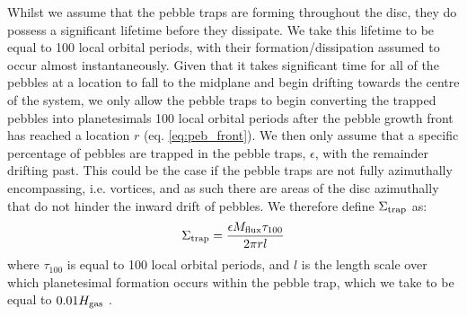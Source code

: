 \documentclass[a4paper,fleqn,usenatbib]{mnras}
\begin{document}
Whilst we assume that the pebble traps are forming throughout the disc, they do possess a significant lifetime before they dissipate.
We take this lifetime to be equal to 100 local orbital periods, with their formation/dissipation assumed to occur almost instantaneously.
Given that it takes significant time for all of the pebbles at a location to fall to the midplane and begin drifting towards the centre of the system, we only allow the pebble traps to begin converting the trapped pebbles into planetesimals 100 local orbital periods after the pebble growth front has reached a location $r$ (eq. \ref{eq:peb_front}).
We then only assume that a specific percentage of pebbles are trapped in the pebble traps, $\epsilon$, with the remainder drifting past.
This could be the case if the pebble traps are not fully azimuthally encompassing, i.e. vortices, and as such there are areas of the disc azimuthally that do not hinder the inward drift of pebbles.
We therefore define $\Sigma_{\rm trap}$ as:
\begin{equation}
\label{eq:sig_trap}
    \Sigma_{\rm trap} = \dfrac{\epsilon M_{\rm flux} \tau_{100}}{2\pi r l}
\end{equation}
where $\tau_{100}$ is equal to 100 local orbital periods, and $l$ is the length scale over which planetesimal formation occurs within the pebble trap, which we take to be equal to $0.01 H_{\rm gas}$ \citep[][see their eq. (3.40)]{Schreiber18}.
\end{document}
